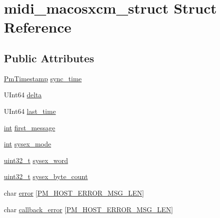 \hypertarget{structmidi__macosxcm__struct}{}\section{midi\+\_\+macosxcm\+\_\+struct Struct Reference}
\label{structmidi__macosxcm__struct}
\subsection*{Public Attributes}
\begin{DoxyCompactItemize}
\item 
\hyperlink{portmidi_8h_acf4245beeef251c4a46d66e99d77ffdf}{Pm\+Timestamp} \hyperlink{structmidi__macosxcm__struct_a4076d731df5c15cebcf3df7f60d9df3c}{sync\+\_\+time}
\item 
U\+Int64 \hyperlink{structmidi__macosxcm__struct_a1527198c35538ef24e96c65380ca0108}{delta}
\item 
U\+Int64 \hyperlink{structmidi__macosxcm__struct_a303a040d9baf5a9392a4f9064897a1da}{last\+\_\+time}
\item 
\hyperlink{xmltok_8h_a5a0d4a5641ce434f1d23533f2b2e6653}{int} \hyperlink{structmidi__macosxcm__struct_ae0cd7eb4fc4b045a42d7942430bf79a8}{first\+\_\+message}
\item 
\hyperlink{xmltok_8h_a5a0d4a5641ce434f1d23533f2b2e6653}{int} \hyperlink{structmidi__macosxcm__struct_a097c1c396255f76cbddcc4aef7d6b0de}{sysex\+\_\+mode}
\item 
\hyperlink{lib-src_2ffmpeg_2win32_2stdint_8h_a6eb1e68cc391dd753bc8ce896dbb8315}{uint32\+\_\+t} \hyperlink{structmidi__macosxcm__struct_aff87ee7b8382f84d5df8942b791cddbd}{sysex\+\_\+word}
\item 
\hyperlink{lib-src_2ffmpeg_2win32_2stdint_8h_a6eb1e68cc391dd753bc8ce896dbb8315}{uint32\+\_\+t} \hyperlink{structmidi__macosxcm__struct_a2c58a46f4a7c0f14c4c8b6c82806e1a8}{sysex\+\_\+byte\+\_\+count}
\item 
char \hyperlink{structmidi__macosxcm__struct_a3f02ae6688373ea4ed28a69129453a7e}{error} \mbox{[}\hyperlink{portmidi_8h_a40b1b3ff3147b3e0dff5843911345c8e}{P\+M\+\_\+\+H\+O\+S\+T\+\_\+\+E\+R\+R\+O\+R\+\_\+\+M\+S\+G\+\_\+\+L\+EN}\mbox{]}
\item 
char \hyperlink{structmidi__macosxcm__struct_aafbd8d732bba6ec5ca7b95ac4965f60f}{callback\+\_\+error} \mbox{[}\hyperlink{portmidi_8h_a40b1b3ff3147b3e0dff5843911345c8e}{P\+M\+\_\+\+H\+O\+S\+T\+\_\+\+E\+R\+R\+O\+R\+\_\+\+M\+S\+G\+\_\+\+L\+EN}\mbox{]}
\item 

\end{DoxyCompactItemize}
